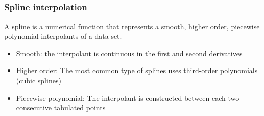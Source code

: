 \subsection*{}
\begin{frame}
  \frametitle{Spline interpolation}
  A spline is a numerical function that represents a {\color{tuealert}smooth}, {\color{tuealert}higher order}, {\color{tuealert}piecewise polynomial} interpolants of a data set.
  \pause
  \begin{itemize}
     \item Smooth: the interpolant is continuous in the first and second derivatives 
     \item Higher order: The most common type of splines uses third-order polynomials (cubic splines)
     \item Piecewise polynomial: The interpolant is constructed between each two consecutive tabulated points
  \end{itemize}
\end{frame}

